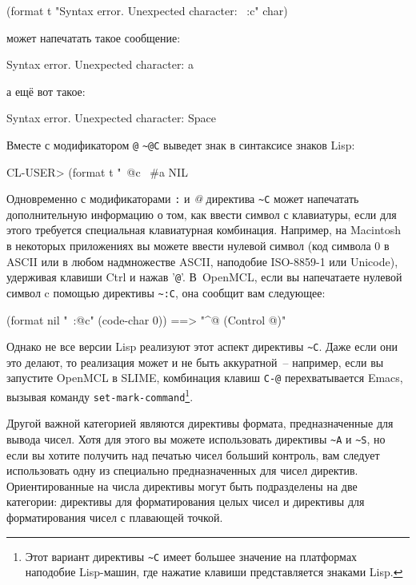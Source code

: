 \begin{myverb}
(format t "Syntax error. Unexpected character: ~:c" char)
\end{myverb}

\noindent{}может напечатать такое сообщение:

\begin{myverb}
  Syntax error. Unexpected character: a
\end{myverb}

\noindent{}а ещё вот такое:

\begin{myverb}
  Syntax error. Unexpected character: Space
\end{myverb}

Вместе с модификатором \lstinline!@! \lstinline!~@С! выведет знак в синтаксисе знаков
Lisp:

\begin{myverb}
CL-USER> (format t "~@c~%
#\bslash{}a
NIL
\end{myverb}

Одновременно с модификаторами \lstinline!:! и \textit{@} директива \lstinline!~C! может
напечатать дополнительную информацию о том, как ввести символ с клавиатуры, если для этого
требуется специальная клавиатурная комбинация. Например, на Macintosh в некоторых
приложениях вы можете ввести нулевой символ (код символа 0 в ASCII или в любом
надмножестве ASCII, наподобие ISO-8859-1 или Unicode), удерживая клавиши Ctrl и нажав
'\lstinline!@!'. В~OpenMCL, если вы напечатаете нулевой символ c помощью директивы
\lstinline!~:C!, она сообщит вам следующее:
  
\begin{myverb}
(format nil "~:@c" (code-char 0)) ==> "^@ (Control @)"
\end{myverb}

Однако не все версии Lisp реализуют этот аспект директивы \lstinline!~C!. Даже если они
это делают, то реализация может и не быть аккуратной~-- например, если вы за\-пусти\-те OpenMCL
в SLIME, комбинация клавиш \lstinline!C-@! перехватывается Emacs, вызывая команду
\lstinline{set-mark-command}\footnote{Этот вариант директивы \lstinline!~C! имеет большее
  значение на платформах наподобие Lisp-машин, где нажатие клавиши представляется знаками
  Lisp.}.
	
Другой важной категорией являются директивы формата, предназначенные для вывода
чисел. Хотя для этого вы можете использовать директивы \lstinline!~A! и \lstinline!~S!, но
если вы хотите получить над печатью чисел больший контроль, вам следует использовать одну
из специально предназначенных для чисел директив. Ориентированные на числа директивы могут
быть подразделены на две категории: директивы для форматирования целых чисел и директивы
для форматирования чисел с плавающей точкой.

